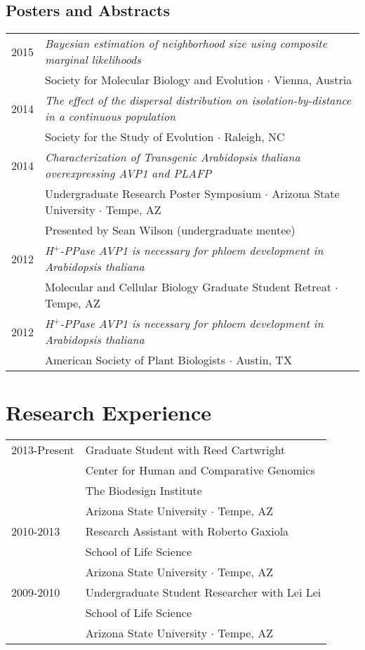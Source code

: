 \documentclass[11pt]{article}
\begin{document}
\subsection*{Posters and Abstracts}
\begin{tabularx}{\linewidth}{l X}
2015&\textit{Bayesian estimation of neighborhood size using composite marginal likelihoods}\\
&Society for Molecular Biology and Evolution $\cdotp$ Vienna, Austria\\
2014&\textit{The effect of the dispersal distribution on isolation-by-distance in a continuous population}\\
&Society for the Study of Evolution $\cdotp$ Raleigh, NC\\
2014&\textit{Characterization of Transgenic Arabidopsis thaliana overexpressing AVP1 and PLAFP}\\
&Undergraduate Research Poster Symposium $\cdotp$ Arizona State University $\cdotp$ Tempe, AZ\\
&Presented by Sean Wilson (undergraduate mentee)\\
2012&\textit{H$^+$-PPase AVP1 is necessary for phloem development in Arabidopsis thaliana}\\
&Molecular and Cellular Biology Graduate Student Retreat $\cdotp$ Tempe, AZ\\
2012&\textit{H$^+$-PPase AVP1 is necessary for phloem development in Arabidopsis thaliana}\\
&American Society of Plant Biologists $\cdotp$ Austin, TX\\
\end{tabularx}

\section*{Research Experience}
\begin{tabularx}{\linewidth}{lX}
2013-Present&Graduate Student with Reed Cartwright\\
&Center for Human and Comparative Genomics\\
&The Biodesign Institute\\
&Arizona State University $\cdotp$ Tempe, AZ\\
2010-2013&Research Assistant with Roberto Gaxiola\\
&School of Life Science\\
&Arizona State University $\cdotp$ Tempe, AZ\\
2009-2010&Undergraduate Student Researcher with Lei Lei\\
&School of Life Science\\
&Arizona State University $\cdotp$ Tempe, AZ\\
\end{tabularx}
\end{document}
